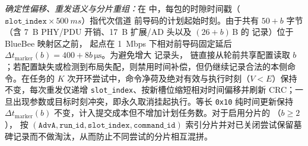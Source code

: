 

\emph{确定性偏移、重发语义与分片重组：}在 \modejc{} 中，每包的时隙时间戳（$\texttt{slot\_index}\times\SI{500}{ms}$）指代次信道 \ble{} 前导码的计划起始时刻。由于共有 $50{+}b$ 字节（含 \SI{7}{B} PHY/PDU 开销、\SI{17}{B} 扩展/AD 头以及 $(26{+}b)$\,B 的 \ble{} 记录）位于 BlueBee 映射区之前，\stdfour{} 起点在 \SI{1}{Mbps} 下相对前导码固定延后 $\Delta t_{\text{marker}}(b){=}400{+}8b\,\si{\micro\second}$。为避免增大 \stdfour{} 记录头，\stdfour{} 链直接从轮前共享配置读取 $b$；若配置缺失或检测到布局失配，则禁用时间补偿，但仍继续记录合法的本侧命令。在任务的 $K$ 次开环尝试中，命令净荷及绝对有效与执行时刻（$V < E$）保持不变，每次重发仅递增 \texttt{slot\_index}、按新槽位缩短相对时间偏移并刷新 CRC；一旦出现参数或目标时刻冲突，即永久取消挂起执行。等长 \texttt{0x10} 纯时间更新保持 $\Delta t_{\text{marker}}(b)$ 不变，计入提交成本但不增加计划任务数。对于启用分片的 \modelc{}（$b\ge 2$），\fragproto{} 按 $(\texttt{AdvA},\allowbreak\texttt{run\_id},\allowbreak\texttt{slot\_index},\allowbreak\texttt{command\_id})$ 索引分片并对已关闭尝试保留墓碑记录而不做淘汰，从而防止不同尝试的分片相互混拼。
